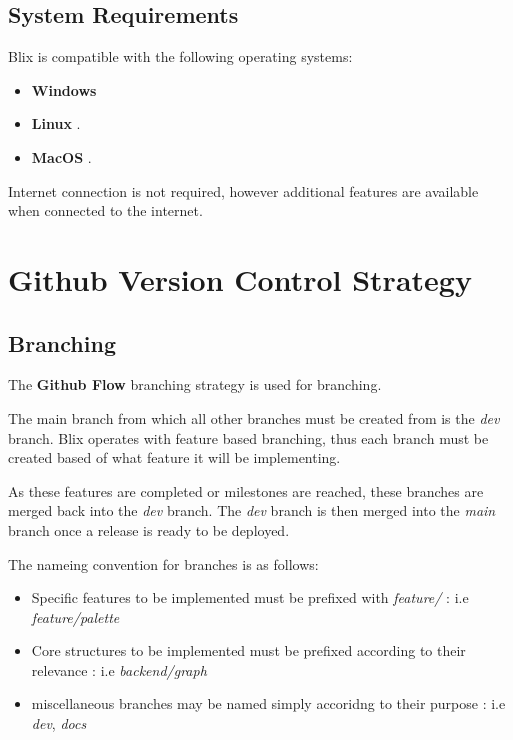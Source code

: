 \documentclass[11pt,a4paper]{article}
\begin{document}
\subsection*{System Requirements}

Blix is compatible with the following operating systems:
\begin{itemize}
  \item[\textbullet] \textbf{Windows}
  \item[\textbullet] \textbf{Linux }.
  \item[\textbullet] \textbf{MacOS }.
\end{itemize}

 Internet connection is not required, however additional features are available when connected to the internet.

\section*{Github Version Control Strategy}

\subsection*{Branching}

The \textbf{Github Flow} branching strategy is used for branching.

The main branch from which all other branches must be created from is the \textit{dev} branch.
Blix operates with feature based branching, thus each branch must be created based of what feature
it will be implementing.

As these features are completed or milestones are reached, these branches are merged back into the \textit{dev} branch.
The \textit{dev} branch is then merged into the \textit{main} branch once a release is ready to be deployed.

The nameing convention for branches is as follows:
\begin{itemize}
    \item[\textbullet] Specific features to be implemented must be prefixed with \textit{feature/} : i.e \textit{feature/palette}
    \item[\textbullet] Core structures to be implemented must be prefixed according to their relevance : \hspace{3cm} i.e \textit{backend/graph}
    \item[\textbullet] miscellaneous branches may be named simply accoridng to their purpose : i.e \textit{dev}, \textit{docs}
\end{itemize}
\end{document}
